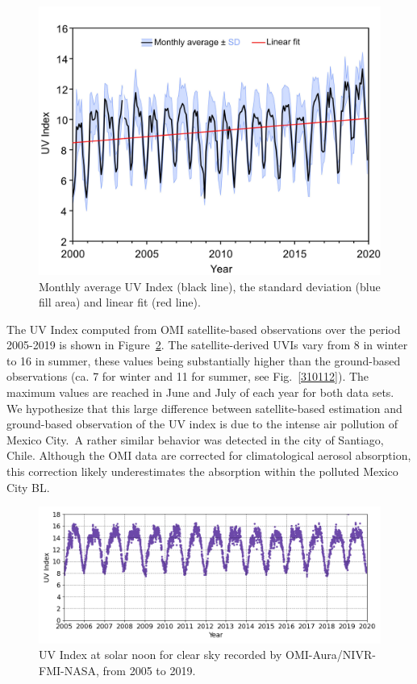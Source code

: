 \documentclass[journal=jacsat,manuscript=article]{achemso}
\begin{document}
\begin{figure}[H]
  \begin{center}
    \includegraphics[width=0.70\columnwidth]{figures/UV_Moving_Average}
    \caption{{Monthly
          average UV Index (black line), the standard deviation (blue fill area) and linear fit (red line).
            {\label{185758}}%
        }}
  \end{center}
\end{figure}

The UV Index computed from OMI satellite-based observations
over the period 2005-2019 is shown in
Figure~{\ref{485116}}. The satellite-derived UVIs vary
from 8 in winter to 16 in summer, these values being substantially higher
than the ground-based observations (ca. 7 for winter and 11 for summer,
see Fig.~{\ref{310112}}). The maximum values are reached in June and July of each year for both data sets.
We hypothesize that this large difference between satellite-based estimation and ground-based
observation of the UV index is due to the intense air pollution of
Mexico City.~A rather similar behavior was detected in the city of Santiago,
Chile.\citep{Cabrera_2012} Although the OMI data are corrected for climatological aerosol absorption\citep{Arola_2009}, this correction likely underestimates the absorption within the polluted Mexico City BL.


\begin{figure}[H]
  \begin{center}
    \includegraphics[width=0.95\columnwidth]{figures/CSUVindex}
    \caption{{UV Index at solar noon for clear sky recorded by OMI-Aura/NIVR-FMI-NASA,
          from 2005 to 2019.
            {\label{485116}}%
        }}
  \end{center}
\end{figure}
\end{document}
